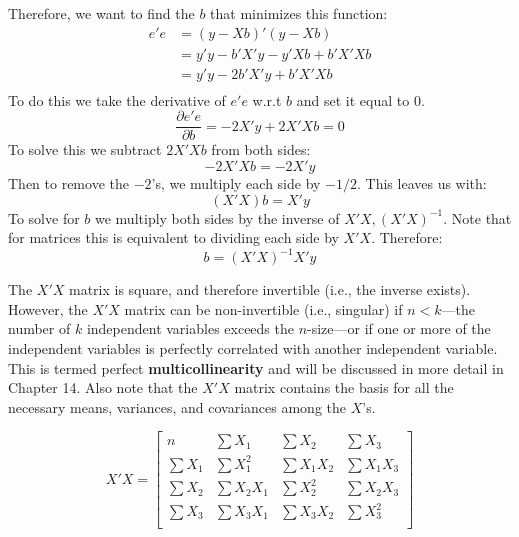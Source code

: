 \documentclass[11pt,openany]{book}\usepackage[]{graphicx}\usepackage[]{color}
\begin{document}
Therefore, we want to find the $b$ that minimizes this function: 
\begin{align*}
e'e &= (y-Xb)'(y-Xb) \\
&=y'y-b'X'y-y'Xb+b'X'Xb \\
&=y'y-2b'X'y+b'X'Xb \\
\end{align*}
\noindent To do this we take the derivative of $e'e$
w.r.t $b$ and set it equal to $0$.
\begin{equation*}
\frac{\partial e'e}{\partial b}=-2X'y+2X'Xb=0   
\end{equation*}
\noindent To solve this we subtract $2X'Xb$ from both sides:
\begin{equation*}
  -2X'Xb=-2X'y
\end{equation*}
\noindent Then to remove the $-2$'s, we multiply each side by
$-1/2$. This leaves us with: 
\begin{equation*}
(X'X)b=X'y  
\end{equation*}
\noindent  To solve for $b$ we multiply both sides by the inverse of $X'X, (X'X)^{-1}$. Note that for matrices this is equivalent to dividing each side by $X'X$. Therefore:
\begin{equation}
  \label{eq:b}
b = (X'X)^{-1}X'y  
\end{equation}

The $X'X$ matrix is square, and therefore invertible (i.e., the inverse exists). However, the $X'X$ matrix can be non-invertible (i.e., singular) if $n < k$---the number of $k$ independent variables exceeds the $n$-size---or if one or more of the independent variables is perfectly correlated with another independent variable. This is termed perfect \textbf{multicollinearity} and will be discussed in more detail in Chapter 14. Also note that the $X'X$ matrix contains the basis for all the necessary means, variances, and covariances among the $X$'s.     

\begin{equation*}
X'X =
\begin{bmatrix}
  n & \sum X_1 & \sum X_2 & \sum X_3 \\
  \sum X_1 & \sum X^{2}_1 & \sum X_1X_2 & \sum X_1X_3 \\
  \sum X_2 & \sum X_2X_1 & \sum X^{2}_2 & \sum X_2X_3 \\
  \sum X_3 & \sum X_3X_1 & \sum X_3X_2 & \sum X^{2}_3 \\ 
\end{bmatrix}
\end{equation*}
\end{document}
